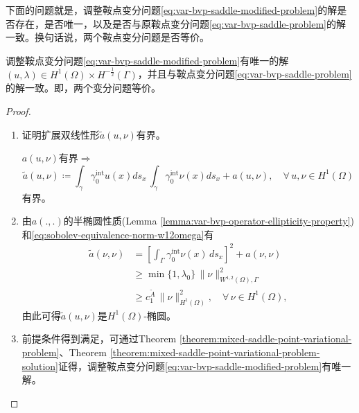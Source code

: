 下面的问题就是，调整鞍点变分问题\eqref{eq:var-bvp-saddle-modified-problem}的解是否存在，是否唯一，以及是否与原鞍点变分问题\eqref{eq:var-bvp-saddle-problem}的解一致。换句话说，两个鞍点变分问题是否等价。
\begin{theorem}[变分问题等价]
  \label{theorem:var-dbvp-saddle-equivalance}
  调整鞍点变分问题\eqref{eq:var-bvp-saddle-modified-problem}有唯一的解$(u,\lambda) \in H^{1}(\Omega) \times H^{-\frac{1}{2}}(\Gamma)$，并且与鞍点变分问题\eqref{eq:var-bvp-saddle-problem}的解一致。即，两个变分问题等价。
\end{theorem}
\begin{proof}
  \begin{enumerate}
  \item 证明扩展双线性形$\tilde{a}(u,\nu)$有界。

  $a(u,\nu)$有界$\Rightarrow$
  \begin{equation*}
    \tilde{a}(u,\nu) \coloneqq \int_{\gamma} \gamma_{0}^{\text{int}} u(x) d s_x \, \int_{\gamma} \gamma_{0}^{\text{int}} \nu(x) d s_x +  a(u,\nu), \quad \forall \, u,\nu \in H^{1}(\Omega)
  \end{equation*}
  有界。

  \item 由$a(.,.)$的半椭圆性质(Lemma \ref{lemma:var-bvp-operator-ellipticity-property})和\eqref{eq:sobolev-equivalence-norm-w12omega}有
  \begin{equation*}
\begin{split}
  \tilde{a}(\nu,\nu) &=
  \left[
  \int_{\Gamma} \gamma_{0}^{\text{int}} \nu(x) \, d s_x
  \right]^2 + a(\nu,\nu) \\
  & \ge \min\{1,\lambda_0\} \, \big\| \nu \big\|_{W^{1,2}(\Omega), \Gamma}^2 \\
  & \ge c_1^{\tilde{A}} \, \big\| \nu \big\|_{H^1(\Omega)}^2, \quad \forall \, \nu \in H^{1}(\Omega),
\end{split}
  \end{equation*}
  由此可得$\tilde{a}(u,\nu)$是$H^{1}(\Omega)$-椭圆。

  \item 前提条件得到满足，可通过Theorem \ref{theorem:mixed-saddle-point-variational-problem}、Theorem \ref{theorem:mixed-saddle-point-variational-problem-solution}证得，调整鞍点变分问题\eqref{eq:var-bvp-saddle-modified-problem}有唯一解。


\end{enumerate}
\end{proof}
